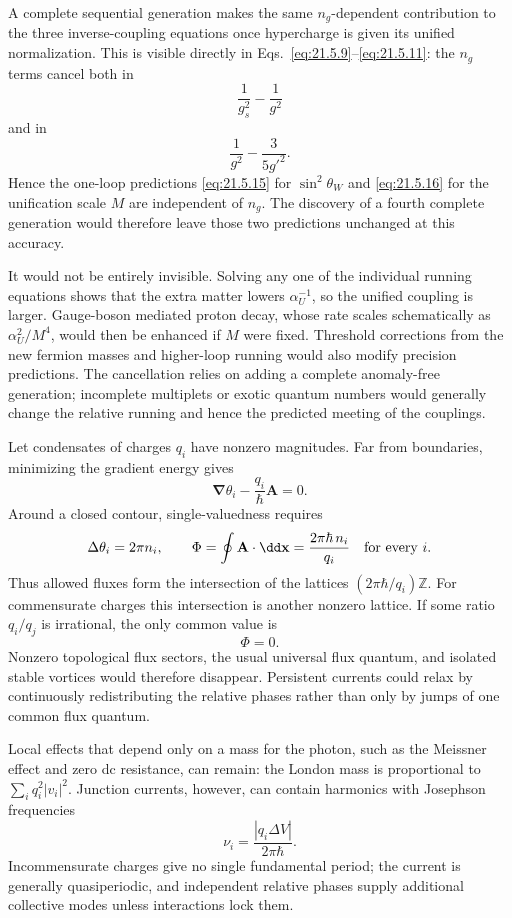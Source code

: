 \begin{enumerate}
  A complete sequential generation makes the same \(n_g\)-dependent
  contribution to the three inverse-coupling equations once hypercharge
  is given its unified normalization.  This is visible directly in
  Eqs.~\eqref{eq:21.5.9}--\eqref{eq:21.5.11}: the \(n_g\) terms cancel
  both in
  \[
    \frac1{g_s^2}-\frac1{g^2}
  \]
  and in
  \[
    \frac1{g^2}-\frac3{5g'^2}.
  \]
  Hence the one-loop predictions
  \eqref{eq:21.5.15} for \(\sin^2\theta_W\) and
  \eqref{eq:21.5.16} for the unification scale \(M\) are independent of
  \(n_g\).  The discovery of a fourth complete generation would
  therefore leave those two predictions unchanged at this accuracy.

  It would not be entirely invisible.  Solving any one of the individual
  running equations shows that the extra matter lowers
  \(\alpha_U^{-1}\), so the unified coupling is larger.  Gauge-boson
  mediated proton decay, whose rate scales schematically as
  \(\alpha_U^2/M^4\), would then be enhanced if \(M\) were fixed.
  Threshold corrections from the new fermion masses and higher-loop
  running would also modify precision predictions.  The cancellation
  relies on adding a complete anomaly-free generation; incomplete
  multiplets or exotic quantum numbers would generally change the
  relative running and hence the predicted meeting of the couplings.

  Let condensates of charges \(q_i\) have nonzero magnitudes.  Far from
  boundaries, minimizing the gradient energy gives
  \[
    \boldsymbol\nabla\theta_i-\frac{q_i}{\hbar}\mathbf A=0.
  \]
  Around a closed contour, single-valuedness requires
  \[
    \Delta\theta_i=2\pi n_i,\qquad
    \Phi=\oint\mathbf A\cdot \dd\mathbf x
      =\frac{2\pi\hbar\,n_i}{q_i}
      \quad\hbox{for every }i.
  \]
  Thus allowed fluxes form the intersection of the lattices
  \((2\pi\hbar/q_i)\mathbb Z\).  For commensurate charges this
  intersection is another nonzero lattice.  If some ratio \(q_i/q_j\)
  is irrational, the only common value is
  \[
    \boxed{\Phi=0.}
  \]
  Nonzero topological flux sectors, the usual universal flux quantum,
  and isolated stable vortices would therefore disappear.  Persistent
  currents could relax by continuously redistributing the relative
  phases rather than only by jumps of one common flux quantum.

  Local effects that depend only on a mass for the photon, such as the
  Meissner effect and zero dc resistance, can remain: the London mass is
  proportional to \(\sum_iq_i^2|v_i|^2\).  Junction currents, however,
  can contain harmonics with Josephson frequencies
  \[
    \nu_i=\frac{|q_i\Delta V|}{2\pi\hbar}.
  \]
  Incommensurate charges give no single fundamental period; the current
  is generally quasiperiodic, and independent relative phases supply
  additional collective modes unless interactions lock them.


\end{enumerate}
